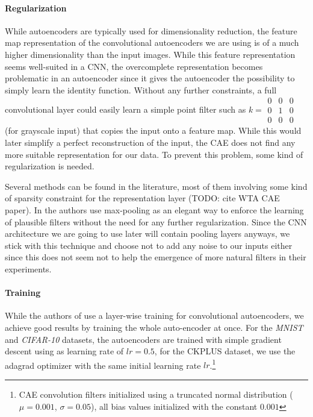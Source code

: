 \documentclass{article}
\begin{document}
    \paragraph{Regularization} 
    While autoencoders are typically used for dimensionality reduction, the feature map representation of the convolutional autoencoders we are using is of a much higher dimensionality than the input images. While this feature representation seems well-suited in a CNN, the overcomplete representation becomes problematic in an autoencoder since it gives the autoencoder the possibility to simply learn the identity function. 
    Without any further constraints, a full convolutional layer could easily learn a simple point filter such as $k = \begin{smallmatrix} 0&0&0\\ 0&1&0 \\ 0&0&0 \end{smallmatrix}$ (for grayscale input) that copies the input onto a feature map. While this would later simplify a perfect reconstruction of the input, the CAE does not find any more suitable representation for our data. 
    To prevent this problem, some kind of regularization is needed. 

    Several methods can be found in the literature, most of them involving some kind of sparsity constraint for the representation layer (TODO: cite WTA CAE paper). In \citep{masci11} the authors use max-pooling as an elegant way to enforce the learning of plausible filters without the need for any further regularization. Since the CNN architecture we are going to use later will contain pooling layers anyways, we stick with this technique and choose not to add any noise to our inputs either since this does not seem not to help the emergence of more natural filters in their experiments. 

    \paragraph{Training} While the authors of \citep{masci11} use a layer-wise training for convolutional autoencoders, we achieve good results by training the whole auto-encoder at once. 
    For the \emph{MNIST} and \emph{CIFAR-10} datasets, the autoencoders are trained with simple gradient descent using as learning rate of $lr = 0.5$, for the CKPLUS dataset, we use the adagrad optimizer with the same initial learning rate $lr$.\footnote{CAE convolution filters initialized using a truncated normal distribution ($\mu = 0.001$, $\sigma = 0.05$), all bias values initialized with the constant $0.001$}
\end{document}
